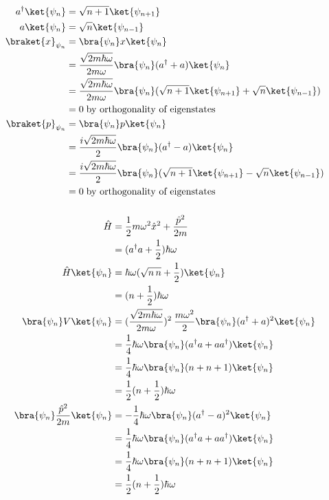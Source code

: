 \documentclass[12pt]{article}
\begin{document}
\subsubsection{} \begin{align*}
    a^\dagger \ket{\psi_n} &= \sqrt{n + 1}\ket{\psi_{n + 1}}\\
    a \ket{\psi_n} &=  \sqrt{n}\ket{\psi_{n - 1}}\\
    \braket{x}_{\psi_n} &= \bra{\psi_n} x \ket{\psi_n}\\
    &= \frac{\sqrt{2m \hbar\omega }}{2m\omega }  \bra{\psi_n} (a^\dagger + a) \ket{\psi_n}\\
    &= \frac{\sqrt{2m \hbar\omega }}{2m\omega }  \bra{\psi_n} (\sqrt{n + 1}
    \ket{\psi_{n + 1}} +\sqrt{n} \ket{\psi_{n -
    1}})\\
    &= 0\;  \text{by orthogonality of eigenstates}\\
    \braket{p}_{\psi_n} &= \bra{\psi_n} p
    \ket{\psi_n}\\ 
    &= \frac{i\sqrt{2m \hbar\omega }}{2}
    \bra{\psi_n} (a^\dagger - a) \ket{\psi_n}\\ 
    &= \frac{i\sqrt{2m
    \hbar\omega }}{2} \bra{\psi_n} (\sqrt{n + 1}
    \ket{\psi_{n + 1}} -\sqrt{n} \ket{\psi_{n - 1}})\\ 
    &= 0\;\text{by orthogonality of eigenstates}
\end{align*}
\subsubsection{}  \begin{align*}
    \hat{H} &=  \frac{1}{2} m\omega^2 \hat{x}^2 + \frac{\hat{p}^2}{2m}\\
    &= (a^\dagger a + \frac{1}{2}) \hbar\omega\\
    \hat{H} \ket{\psi_n} &= \hbar\omega (\sqrt{n\, n} + \frac{1}{2})
    \ket{\psi_n}\\
    &= (n + \frac{1}{2}) \hbar\omega \\
    \bra{\psi_n} V \ket{\psi_n} &= (\frac{\sqrt{2m \hbar\omega} }{2m\omega } )^2\:  \frac{m\omega^2}{2}\bra{\psi_n} (a^\dagger + a)^2                \ket{\psi_n} \\
    &= \frac{1}{4} \hbar\omega\bra{\psi_n} (a^\dagger a + a a^\dagger ) \ket{\psi_n} \\
    &= \frac{1}{4} \hbar\omega\bra{\psi_n} (n + n + 1) \ket{\psi_n} \\
    &= \frac{1}{2} (n + \frac{1}{2}) \hbar\omega \\
    \bra{\psi_n} \frac{\hat{p}^2}{2m} \ket{\psi_n} &= - \frac{1}{4} \hbar\omega \bra{\psi_n}
    (a^\dagger - a)^2 \ket{\psi_n} \\ &= \frac{1}{4} \hbar\omega \bra{\psi_n} (a^\dagger a + a a^\dagger )
    \ket{\psi_n} \\ &= \frac{1}{4} \hbar\omega
    \bra{\psi_n} (n + n + 1) \ket{\psi_n} \\ &=
    \frac{1}{2} (n + \frac{1}{2}) \hbar\omega
\end{align*}
\end{document}
